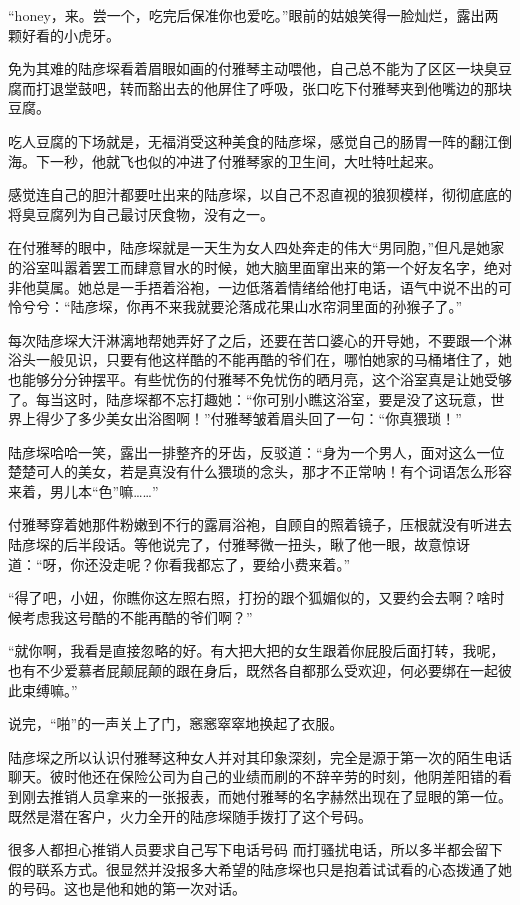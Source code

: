 \documentclass[11pt,a4paper]{article}
\begin{document}
“honey，来。尝一个，吃完后保准你也爱吃。”眼前的姑娘笑得一脸灿烂，露出两颗好看的小虎牙。﻿﻿

免为其难的陆彦堔看着眉眼如画的付雅琴主动喂他，自己总不能为了区区一块臭豆腐而打退堂鼓吧，转而豁出去的他屏住了呼吸，张口吃下付雅琴夹到他嘴边的那块豆腐。﻿﻿

吃人豆腐的下场就是，无福消受这种美食的陆彦堔，感觉自己的肠胃一阵的翻江倒海。下一秒，他就飞也似的冲进了付雅琴家的卫生间，大吐特吐起来。﻿﻿

感觉连自己的胆汁都要吐出来的陆彦堔，以自己不忍直视的狼狈模样，彻彻底底的将臭豆腐列为自己最讨厌食物，没有之一。﻿﻿

在付雅琴的眼中，陆彦堔就是一天生为女人四处奔走的伟大“男同胞，”但凡是她家的浴室叫嚣着罢工而肆意冒水的时候，她大脑里面窜出来的第一个好友名字，绝对非他莫属。她总是一手捂着浴袍，一边低落着情绪给他打电话，语气中说不出的可怜兮兮：“陆彦堔，你再不来我就要沦落成花果山水帘洞里面的孙猴子了。”﻿﻿

每次陆彦堔大汗淋漓地帮她弄好了之后，还要在苦口婆心的开导她，不要跟一个淋浴头一般见识，只要有他这样酷的不能再酷的爷们在，哪怕她家的马桶堵住了，她也能够分分钟摆平。有些忧伤的付雅琴不免忧伤的晒月亮，这个浴室真是让她受够了。每当这时，陆彦堔都不忘打趣她：“你可别小瞧这浴室，要是没了这玩意，世界上得少了多少美女出浴图啊！”付雅琴皱着眉头回了一句：“你真猥琐！”﻿﻿

陆彦堔哈哈一笑，露出一排整齐的牙齿，反驳道：“身为一个男人，面对这么一位楚楚可人的美女，若是真没有什么猥琐的念头，那才不正常呐！有个词语怎么形容来着，男儿本“色”嘛……”﻿﻿

付雅琴穿着她那件粉嫩到不行的露肩浴袍，自顾自的照着镜子，压根就没有听进去陆彦堔的后半段话。等他说完了，付雅琴微一扭头，瞅了他一眼，故意惊讶道：“呀，你还没走呢？你看我都忘了，要给小费来着。”﻿﻿

“得了吧，小妞，你瞧你这左照右照，打扮的跟个狐媚似的，又要约会去啊？啥时候考虑我这号酷的不能再酷的爷们啊？”﻿﻿

“就你啊，我看是直接忽略的好。有大把大把的女生跟着你屁股后面打转，我呢，也有不少爱慕者屁颠屁颠的跟在身后，既然各自都那么受欢迎，何必要绑在一起彼此束缚嘛。”﻿﻿

说完，“啪”的一声关上了门，窸窸窣窣地换起了衣服。﻿﻿

陆彦堔之所以认识付雅琴这种女人并对其印象深刻，完全是源于第一次的陌生电话聊天。彼时他还在保险公司为自己的业绩而刷的不辞辛劳的时刻，他阴差阳错的看到刚去推销人员拿来的一张报表，而她付雅琴的名字赫然出现在了显眼的第一位。既然是潜在客户，火力全开的陆彦堔随手拨打了这个号码。﻿﻿

很多人都担心推销人员要求自己写下电话号码 而打骚扰电话，所以多半都会留下假的联系方式。很显然并没报多大希望的陆彦堔也只是抱着试试看的心态拨通了她的号码。这也是他和她的第一次对话。﻿﻿
\end{document}
